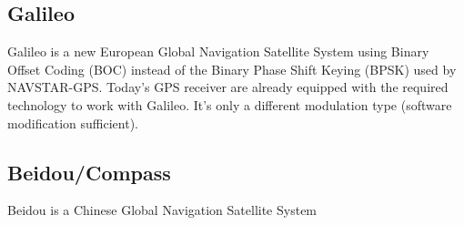 \subsection{Galileo}
	Galileo is a new European Global Navigation Satellite System using Binary Offset Coding (BOC) instead of the Binary Phase Shift Keying (BPSK) 
	used by NAVSTAR-GPS. Today's GPS receiver are already equipped with the required technology to work with Galileo. It's only a 
	different modulation type (software modification sufficient).
\subsection{Beidou/Compass}
	Beidou is a Chinese Global Navigation Satellite System